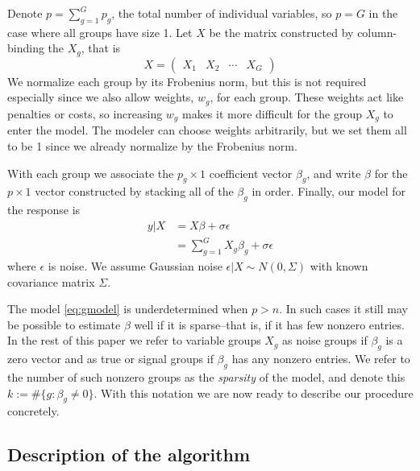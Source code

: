 \documentclass{imsart}
\begin{document}
Denote $p = \sum_{g=1}^Gp_g$,
the total number of individual variables, so $p = G$ in the
case where all groups have size 1. Let $X$ be the matrix constructed
by column-binding the $X_g$, that is  
\begin{equation*}
X = \begin{pmatrix} X_1 & X_2 & \cdots & X_G  \end{pmatrix}
\end{equation*}
We normalize each group by its Frobenius norm, but this is not required
especially since we also allow weights, $w_g$, for each group. These
weights act like penalties or costs, so increasing $w_g$ makes it
more difficult for the group $X_g$ to enter the model. The
modeler can choose weights arbitrarily, but we set them all to be
1 since we already normalize by the Frobenius norm.

With each group we associate the $p_g \times 1$ coefficient vector
$\beta_g$, and write $\beta$ for the $p \times 1$ vector constructed
by stacking all of the $\beta_g$ in order.  Finally, our model for the
response is
\begin{equation}
\begin{aligned}
\label{eq:gmodel}
y | X& = X \beta + \sigma \epsilon \\
   & = \sum_{g=1}^G X_g \beta_g + \sigma \epsilon
\end{aligned}
\end{equation}
where $\epsilon$ is noise. We assume Gaussian noise
$\epsilon | X \sim N(0, \Sigma)$ with known covariance matrix $\Sigma$.


The model \eqref{eq:gmodel} is underdetermined when $p > n$.
In such cases it still may be possible to
estimate $\beta$ well if it is sparse--that is, if it has few nonzero
entries. In the rest of this paper we refer to variable groups $X_g$
as noise groups if $\beta_g$ is a zero vector and as true or signal
groups if $\beta_g$ has any nonzero entries. We refer to the number
of such nonzero groups as the \textit{sparsity} of the model, and
denote this $k := \# \{ g : \beta_g \neq 0 \}$. With this notation
we are now ready to describe our procedure concretely.


\subsection{Description of the algorithm}
\end{document}
